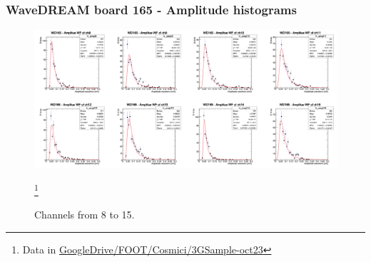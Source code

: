 \begin{frame} [fragile]
    \small
        \frametitle{WaveDREAM board 165 - Amplitude histograms}
                \begin{figure}
             \centering
                \includegraphics[scale=0.28]{figures/hist_ampl_3.png}
                \caption{Channels from 8 to 15.} \footnote{Data in \href{https://drive.google.com/drive/u/1/folders/16qDMMqx-QTr3lPnTk-1lWUYrBUTcSdOi}{GoogleDrive/FOOT/Cosmici/3GSample-oct23}}
            \end{figure}
    \end{frame}
